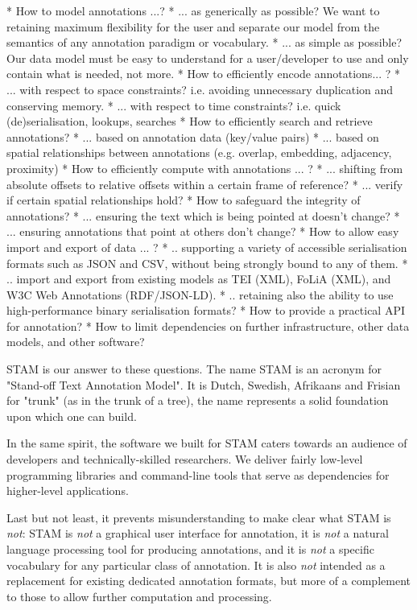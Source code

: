 \documentclass{jors}
\begin{document}
* How to model annotations  ...?
    * ... as generically as possible? We want to retaining maximum flexibility for the user and separate our model from the semantics of any annotation paradigm or vocabulary.
    * ... as simple as possible? Our data model must be easy to understand for a user/developer to use and only contain what is needed, not more.
* How to efficiently encode annotations... ?
   * ... with respect to space constraints? i.e. avoiding unnecessary duplication and conserving memory.
   * ... with respect to time constraints? i.e. quick (de)serialisation, lookups, searches
* How to efficiently search and retrieve annotations?
    * ... based on annotation data (key/value pairs)
    * ... based on spatial relationships between annotations (e.g. overlap, embedding, adjacency, proximity)
* How to efficiently compute with annotations ... ?
    * ... shifting from absolute offsets to relative offsets within a certain frame of reference?
    * ... verify if certain spatial relationships hold?
* How to safeguard the integrity of annotations?
    * ... ensuring the text which is being pointed at doesn't change?
    * ... ensuring annotations that point at others don't change?
* How to allow easy import and export of data ... ? 
    * .. supporting a variety of accessible serialisation formats such as JSON and CSV, without being strongly bound to any of them.
    * .. import and export from existing models as TEI (XML), FoLiA (XML), and W3C Web Annotations (RDF/JSON-LD).
    * .. retaining also the ability to use high-performance binary serialisation formats?
* How to provide a practical API for annotation?
* How to limit dependencies on further infrastructure, other data models, and other software?

STAM is our answer to these questions. The name STAM is an acronym for
"Stand-off Text Annotation Model". It is Dutch, Swedish, Afrikaans and Frisian for
"trunk" (as in the trunk of a tree), the name represents a solid foundation
upon which one can build.

In the same spirit, the software we built for STAM caters towards an audience
of developers and technically-skilled researchers. We deliver fairly low-level
programming libraries and command-line tools that serve as dependencies for
higher-level applications. 

Last but not least, it prevents misunderstanding to make clear what STAM is
\emph{not}: STAM is \emph{not} a graphical user interface for annotation, it is
\emph{not} a natural language processing tool for producing annotations, and it
is \emph{not} a specific vocabulary for any particular class of annotation. It
is also \emph{not} intended as a replacement for existing dedicated annotation
formats, but more of a complement to those to allow further computation and
processing.
\end{document}
